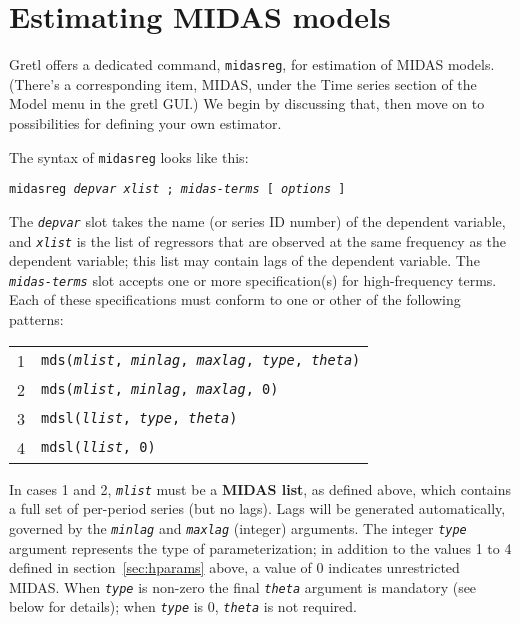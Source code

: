 \documentclass{article}
\begin{document}
\section{Estimating MIDAS models}
\label{sec:estimation}

Gretl offers a dedicated command, \texttt{midasreg}, for estimation of
MIDAS models. (There's a corresponding item, \textsf{MIDAS}, under the
\textsf{Time series} section of the \textsf{Model} menu in the gretl
GUI.) We begin by discussing that, then move on to possibilities for
defining your own estimator.

The syntax of \texttt{midasreg} looks like this:

\texttt{midasreg \textsl{depvar} \textsl{xlist} ;
\textsl{midas-terms} [ \textsl{options} ]}

The \texttt{\textsl{depvar}} slot takes the name (or series ID number)
of the dependent variable, and \texttt{\textsl{xlist}} is the list of
regressors that are observed at the same frequency as the dependent
variable; this list may contain lags of the dependent variable. The
\texttt{\textsl{midas-terms}} slot accepts one or more specification(s)
for high-frequency terms. Each of these specifications must conform to
one or other of the following patterns:

\begin{tabular}{ll}
1 & \texttt{mds(\textsl{mlist}, \textsl{minlag}, 
   \textsl{maxlag}, \textsl{type}, \textsl{theta})} \\
2 & \texttt{mds(\textsl{mlist}, \textsl{minlag}, \textsl{maxlag}, 0)} \\[4pt]
3 & \texttt{mdsl(\textsl{llist}, \textsl{type}, \textsl{theta})} \\
4 & \texttt{mdsl(\textsl{llist}, 0)}
\end{tabular}

In cases 1 and 2, \texttt{\textsl{mlist}} must be a \textbf{MIDAS
  list}, as defined above, which contains a full set of per-period
series (but no lags). Lags will be generated automatically, governed
by the \texttt{\textsl{minlag}} and \texttt{\textsl{maxlag}} (integer)
arguments. The integer \texttt{\textsl{type}} argument represents the
type of parameterization; in addition to the values 1 to 4 defined in
section~\ref{sec:hparams} above, a value of 0 indicates unrestricted
MIDAS. When \texttt{\textsl{type}} is non-zero the final
\texttt{\textsl{theta}} argument is mandatory (see below for details);
when \texttt{\textsl{type}} is 0, \texttt{\textsl{theta}} is not
required.
\end{document}
